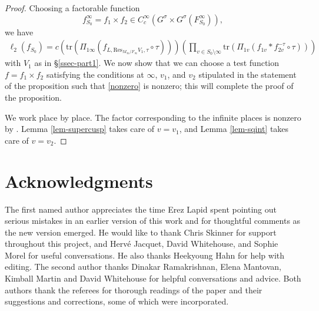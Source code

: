 \documentclass[12pt]{amsart}
\theoremstyle{remark}
\numberwithin{equation}{section}
\theoremstyle{definition}
\numberwithin{equation}{subsection}
\begin{document}
\begin{proof}
Choosing a factorable function
$$
f_{S_0}^{\infty}=f_{1} \times f_{2} \in C_c^{\infty}(G^{\sigma} \times G^{\sigma}(F_{S_0}^{\infty})),
$$
we have
\begin{align} \label{nonzero}
\ell_2(f_{S_0})=
c\left(\mathrm{tr}(\Pi_{1\infty}(f_{L,\mathrm{Res}_{M_{\infty}/F_{\infty}}V_1,\tau} \circ \tau )) \right)
\left(\prod_{v \in S_0 \setminus \infty}\mathrm{tr}\left(\Pi_{1v}(f_{1v}*f_{2v}^{-\tau} \circ \tau)\right)\right)
\end{align}
with $V_1$ as in \S \ref{ssec-part1}.
 We now show that we can choose a
test function $f=f_{1} \times f_2$ satisfying the conditions at $\infty$, $v_1$, and $v_2$ stipulated in the statement
of the proposition  such that \eqref{nonzero} is
nonzero; this will complete the proof of the proposition.

We work place by place.  The factor corresponding to the infinite places is nonzero by \cite[Lemme 4.2]{LabCM}.  Lemma \ref{lem-supercusp} takes care of $v=v_1$, and Lemma \ref{lem-sqint}
takes care of $v=v_2$.
\end{proof}

\section*{Acknowledgments}
The first named author appreciates the time Erez Lapid spent pointing out serious mistakes in
an earlier version of this work and for thoughtful comments as the new version emerged.
He would like to thank Chris Skinner for support throughout this project, and Herv\'e Jacquet, David Whitehouse, and Sophie Morel for useful conversations.  He also thanks  Heekyoung Hahn for help with editing.  The second author thanks Dinakar Ramakrishnan, Elena Mantovan, Kimball Martin and David Whitehouse for helpful conversations and advice.  Both authors
thank the referees for thorough readings of the paper and their suggestions and corrections, some of which were incorporated.
\end{document}
